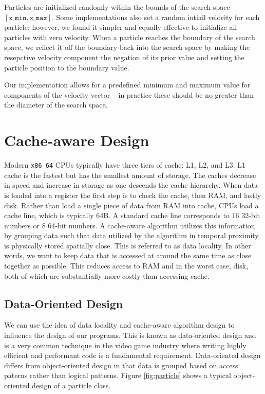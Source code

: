 Particles are initialized randomly within the bounds of the search space
$[\texttt{x\_min}, \texttt{x\_max}]$. Some implementations also set a random
intiail velocity for each particle; however, we found it simpler and equally
effective to initialize all particles with zero velocity. When a particle
reaches the boundary of the search space, we reflect it off the boundary back
into the search space by making the resepctive velocity component the negation
of its prior value and setting the particle position to the boundary value.

Our implementation allows for a predefined minimum and maximum value for
components of the velocity vector -- in practice these should be no greater than
the diameter of the search space.

\section{Cache-aware Design}\label{sec:cache}
Modern \texttt{x86\_64} CPUs typically have three tiers of cache: L1, L2, and
L3. L1 cache is the fastest but has the smallest amount of storage. The caches
decrease in speed and increase in storage as one descends the cache
hierarchy. When data is loaded into a register the first step is to check the
cache, then RAM, and lastly disk. Rather than load a single piece of data from
RAM into cache, CPUs load a cache line, which is typically 64B. A standard cache
line corresponds to 16 32-bit numbers or 8 64-bit numbers. A cache-aware
algorithm utilizes this information by grouping data such that data utilized by
the algorithm in temporal proximity is physically stored spatially close. This
is referred to as data locality. In other words, we want to keep data that is
accessed at around the same time as close together as possible. This reduces
access to RAM and in the worst case, disk, both of which are substantially more
costly than accessing cache.

\subsection{Data-Oriented Design}
We can use the idea of data locality and cache-aware algorithm design to
influence the design of our programs. This is known as data-oriented design and
is a very common technique in the video game industry where writing highly
efficient and performant code is a fundamental requirement. Data-oriented design
differs from object-oriented design in that data is grouped based on access
paterns rather than logical patterns. Figure \ref{fig:particle} shows a typical
object-oriented design of a particle class.

